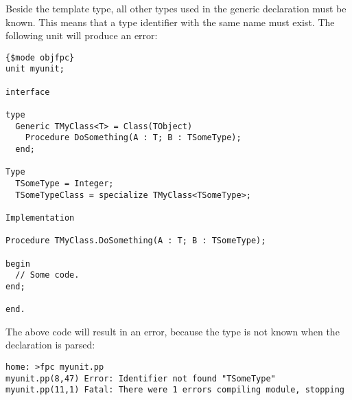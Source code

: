 Beside the template type, all other types used in the generic declaration must be
known.
This means that a type identifier with the same name must exist. 
The following unit will produce an error:
\begin{verbatim}
{$mode objfpc}
unit myunit;

interface

type 
  Generic TMyClass<T> = Class(TObject)
    Procedure DoSomething(A : T; B : TSomeType);
  end;

Type
  TSomeType = Integer;
  TSomeTypeClass = specialize TMyClass<TSomeType>;

Implementation

Procedure TMyClass.DoSomething(A : T; B : TSomeType);

begin
  // Some code.
end;

end.
\end{verbatim}
The above code will result in an error, because the type  is
not known when the declaration is parsed:
\begin{verbatim}
home: >fpc myunit.pp
myunit.pp(8,47) Error: Identifier not found "TSomeType"
myunit.pp(11,1) Fatal: There were 1 errors compiling module, stopping
\end{verbatim}

